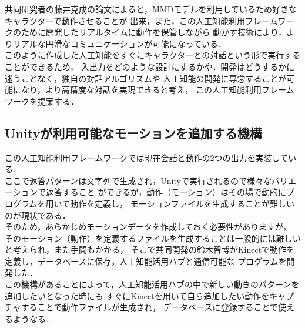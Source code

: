 共同研究者の藤井克成の論文\cite{fuji}によると，MMDモデルを利用しているため好きなキャラクターで動作させることが
出来，また，この人工知能利用フレームワークのために開発したリアルタイムに動作を保管しながら
動かす技術により，よりリアルな円滑なコミュニケーションが可能になっている．\\

このように作成した人工知能をすぐにキャラクターとの対話という形で実行することができるため，
入出力をどのような設計にするかや，開発はどうするかに迷うことなく，独自の対話アルゴリズムや
人工知能の開発に専念することが可能になり，より高精度な対話を実現できると考え，
この人工知能利用フレームワークを提案する．\\

\subsection{Unityが利用可能なモーションを追加する機構}
この人工知能利用フレームワークでは現在会話と動作の2つの出力を実装している．\\

ここで返答パターンは文字列で生成され，Unityで実行されるので様々なバリエーションで返答すること
ができるが，動作（モーション）はその場で動的にプログラムを用いて動作を定義し，
モーションファイルを生成することが難しいのが現状である．\\

そのため，あらかじめモーションデータを作成しておく必要性がありますが，
そのモーション（動作）を定義するファイルを生成することは一般的には難しいと考えられ，また手間もかかる，
そこで共同開発の鈴木智博がKinectで動作を定義し，データベースに保存，人工知能活用ハブと通信可能な
プログラムを開発した\cite{suzuki}．\\

この機構があることによって，人工知能活用ハブの中で新しい動きのパターンを追加したいとなった時にも
すぐにKinectを用いて自ら追加したい動作をキャプチャすることで動作ファイルが生成され，
データベースに登録することで使えるようなる．

